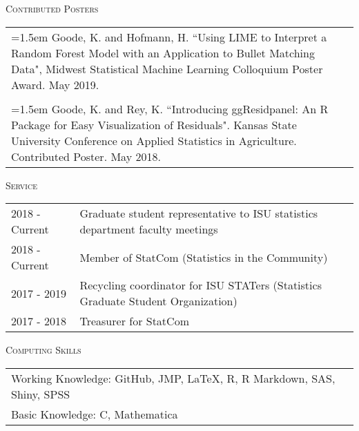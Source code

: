 \documentclass[10pt, oneside]{article}
\begin{document}
\noindent \textsc{Contributed Posters} \hrulefill
\begin{longtable}{p{16.5cm}}
\hangindent=1.5em Goode, K. and Hofmann, H. ``Using LIME to Interpret a Random Forest Model with an Application to Bullet Matching Data", Midwest Statistical Machine Learning Colloquium Poster Award. May 2019.\\
\\ 
\hangindent=1.5em Goode, K. and Rey, K. ``Introducing ggResidpanel: An R Package for Easy Visualization of Residuals". Kansas State University Conference on Applied Statistics in Agriculture. Contributed Poster. May 2018.
\end{longtable}

\noindent \textsc{Service} \hrulefill
\begin{longtable}{p{2.5cm}p{14cm}}
\hfill{2018 - Current} & Graduate student representative to ISU statistics department faculty meetings\\
\hfill{2018 - Current} & Member of StatCom (Statistics in the Community)\\
\hfill{2017 - 2019} & Recycling coordinator for ISU STATers (Statistics Graduate Student Organization)\\
\hfill{2017 - 2018} & Treasurer for StatCom
\end{longtable}

\noindent \textsc{Computing Skills} \hrulefill
\begin{longtable}{p{16.5cm}}
Working Knowledge: GitHub, JMP, \LaTeX, R, R Markdown, SAS, Shiny, SPSS\\
Basic Knowledge: C, Mathematica
\end{longtable}
\end{document}
